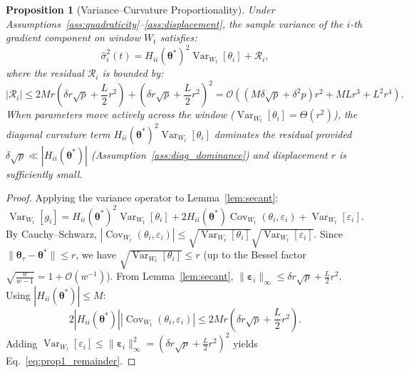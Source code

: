 \documentclass[11pt,a4paper]{article}
\newtheorem{proposition}{Proposition}
\begin{document}
\begin{proposition}[Variance--Curvature Proportionality]
\label{prop:variance_curvature}
Under Assumptions~\ref{ass:quadraticity}--\ref{ass:displacement}, the sample variance of the $i$-th gradient component on window $W_t$ satisfies:
\begin{equation}
\hat{\sigma}_i^2(t) = H_{ii}(\boldsymbol{\theta}^*)^2 \operatorname{Var}_{W_t}[\theta_i] + \mathcal{R}_i,
\end{equation}
where the residual $\mathcal{R}_i$ is bounded by:
\begin{equation}
|\mathcal{R}_i| \le 2 M r \left( \delta r \sqrt{p} + \frac{L}{2} r^2 \right) + \left( \delta r \sqrt{p} + \frac{L}{2} r^2 \right)^2 = \mathcal{O}\left( (M \delta \sqrt{p} + \delta^2 p) r^2 + M L r^3 + L^2 r^4 \right).
\label{eq:prop1_remainder}
\end{equation}
When parameters move actively across the window ($\operatorname{Var}_{W_t}[\theta_i] = \Theta(r^2)$), the diagonal curvature term $H_{ii}(\boldsymbol{\theta}^*)^2 \operatorname{Var}_{W_t}[\theta_i]$ dominates the residual provided $\delta \sqrt{p} \ll |H_{ii}(\boldsymbol{\theta}^*)|$ (Assumption~\ref{ass:diag_dominance}) and displacement $r$ is sufficiently small.
\end{proposition}

\begin{proof}
Applying the variance operator to Lemma~\ref{lem:secant}:
\begin{equation}
\operatorname{Var}_{W_t}[g_i] = H_{ii}(\boldsymbol{\theta}^*)^2 \operatorname{Var}_{W_t}[\theta_i] + 2 H_{ii}(\boldsymbol{\theta}^*) \operatorname{Cov}_{W_t}(\theta_i, \varepsilon_i) + \operatorname{Var}_{W_t}[\varepsilon_i].
\end{equation}
By Cauchy--Schwarz, $|\operatorname{Cov}_{W_t}(\theta_i, \varepsilon_i)| \le \sqrt{\operatorname{Var}_{W_t}[\theta_i]} \sqrt{\operatorname{Var}_{W_t}[\varepsilon_i]}$. Since $\|\boldsymbol{\theta}_\tau - \boldsymbol{\theta}^*\| \le r$, we have $\sqrt{\operatorname{Var}_{W_t}[\theta_i]} \le r$ (up to the Bessel factor $\sqrt{\frac{w}{w-1}} = 1 + \mathcal{O}(w^{-1})$). From Lemma~\ref{lem:secant}, $\|\boldsymbol{\varepsilon}_i\|_\infty \le \delta r \sqrt{p} + \frac{L}{2} r^2$. Using $|H_{ii}(\boldsymbol{\theta}^*)| \le M$:
\begin{equation}
2 |H_{ii}(\boldsymbol{\theta}^*)| |\operatorname{Cov}_{W_t}(\theta_i, \varepsilon_i)| \le 2 M r \left( \delta r \sqrt{p} + \frac{L}{2} r^2 \right).
\end{equation}
Adding $\operatorname{Var}_{W_t}[\varepsilon_i] \le \|\boldsymbol{\varepsilon}_i\|_\infty^2 = (\delta r \sqrt{p} + \frac{L}{2} r^2)^2$ yields Eq.~\eqref{eq:prop1_remainder}.
\end{proof}
\end{document}
